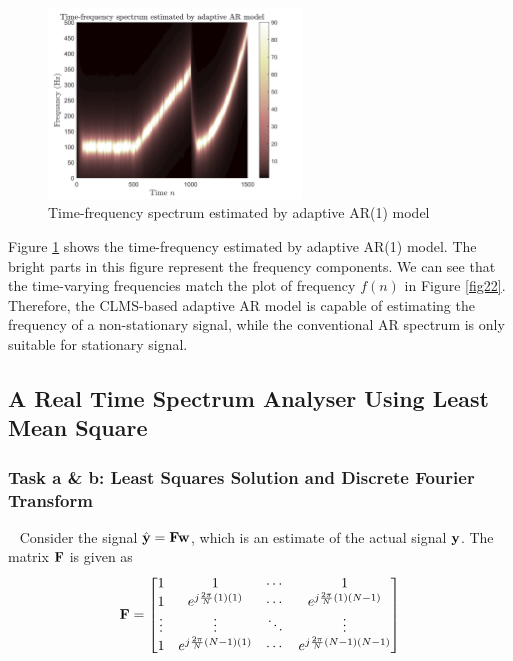 \documentclass[10pt]{article}
\begin{document}
\begin{figure}[htbp]
    \centering
	\includegraphics[width=0.6\textwidth]{fig/3.2_3.png}

    \caption{Time-frequency spectrum estimated by adaptive AR(1) model}
    \label{fig24}
\end{figure}

Figure \ref{fig24} shows the time-frequency estimated by adaptive AR(1) model.
The bright parts in this figure represent the frequency components. We can see that 
the time-varying frequencies match the plot of frequency $f(n)$ in Figure \ref{fig22}.
Therefore, the CLMS-based adaptive AR model is capable of estimating the frequency of 
a non-stationary signal, while the conventional AR spectrum is only suitable for stationary signal.

\subsection{A Real Time Spectrum Analyser Using Least Mean Square}

\subsubsection{Task a \& b: Least Squares Solution and Discrete Fourier Transform}
\ \indent
Consider the signal $\hat{\bf{y}} = {\bf{Fw}}$, which is an estimate of the actual signal 
${\bf{y}}$. The matrix ${\bf{F}}$ is given as 
\begin{equation}
	{\bf{F}} = \left[ \begin{matrix}
		1 & 1 & \cdots & 1\\
		1 & e^{j \frac{2\pi}{N}(1)(1)} & \cdots & e^{j \frac{2\pi}{N}(1)(N-1)}\\
		\vdots & \vdots & \ddots & \vdots \\
		1 & e^{j \frac{2\pi}{N}(N-1)(1)} & \cdots & e^{j \frac{2\pi}{N}(N-1)(N-1)}
	\end{matrix} \right] \label{eq89}
\end{equation}
\end{document}
